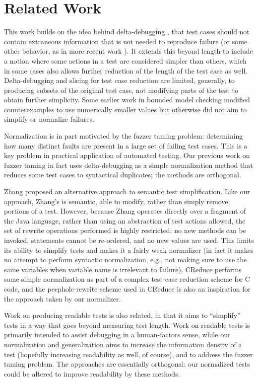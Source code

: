 \section{Related Work}

This work builds on the idea behind delta-debugging \cite{DD}, that test cases
should not contain extraneous information that is not needed to
reproduce failure (or some other behavior, as in more recent work \cite{icst2014,stvrcausereduce}).  It extends this beyond length to include a notion
where some actions in a test are considered simpler than others, which
in some cases also allows further reduction of the length of the test
case as well.  Delta-debugging and slicing \cite{TCminim} for test case
reduction are limited, generally, to producing subsets of the original
test case, not modifying parts of the test to obtain further
simplicity.  Some earlier work in bounded model checking modified
counterexamples to use numerically smaller values \cite{MakeMost} but
otherwise did not aim to simplify or normalize failures.

Normalization is in part motivated by the fuzzer taming \cite{PLDI13}
problem:  determining how many distinct faults are present in a large
set of failing test cases.  This is a key problem in practical
application of automated testing.  Our previous work on fuzzer taming
in fact uses delta-debugging as a simple normalization method that
reduces some test cases to syntactical duplicates; the methods are orthogonal.

Zhang \cite{SaiSimple} proposed an alternative approach to semantic
test simplification.  Like our approach, Zhang's is semantic, able to
modify, rather than simply remove, portions of a test.  However,
because Zhang operates directly over a fragment of the Java language,
rather than using an abstraction of test actions allowed, the set of
rewrite operations performed is highly restricted:  no new methods can
be invoked, statements cannot be re-ordered, and no new values are
used.  This limits its ability to simplify tests and makes it a fairly
weak normalizer (in fact it makes no attempt to perform syntactic
normalization, e.g., not making sure to use the same variables when
variable name is irrelevant to failure).
CReduce \cite{CReduce} performs some simple normalization as part of a
complex test-case reduction scheme for C code, and the
peephole-rewrite scheme used in CReduce is also an inspiration for the
approach taken by our normalizer.

Work on producing readable tests \cite{Guava,Readable} is also
related, in that it aims to ``simplify'' tests in a way that goes
beyond measuring test length.  Work on readable tests is primarily
intended to assist debugging in a human-factors sense, while our
normalization and generalization aims to increase the information
density of a test (hopefully increasing readability as well, of
course), and to address the fuzzer taming problem.  The approaches are
essentially orthogonal: our normalized tests could be altered to
improve readability by these methods.

